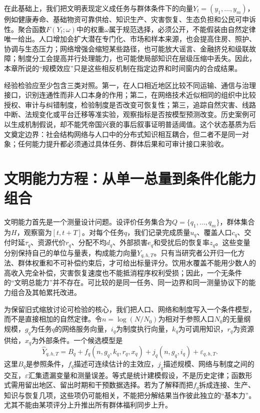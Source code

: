 在此基础上，我们把文明表现定义成任务与群体条件下的向量$Y_t=(y_1,\ldots,y_m)$，例如健康寿命、基础物资可靠供给、知识生产、灾害恢复、生态负担和公民可申诉性。聚合函数$F(Y_t;\omega)$中的权重$\omega$属于规范选择，必须公开，不能假装由自然定律唯一给出。人口增加会扩大潜在专门化、市场和样本来源，也会提高住房、照护、协调与生态压力；网络增强会缩短某些路径，也可能放大谣言、金融挤兑和级联故障；制度分工会提高并行处理能力，也可能使局部知识在层级压缩中丢失。因此，本章所说的“规模效应”只是这些相反机制在指定边界和时间窗内的合成结果。

经验检验应至少包含三类对照。第一，在人口相近地区比较不同运输、通信与治理接口，识别连通性而非人口本身的作用；第二，在网络技术近似相同的组织中比较授权、审计与纠错制度，检验制度是否改变可恢复性；第三，追踪自然灾害、线路中断、法规变化或平台迁移等准实验，观察指标是否按模型预测改变。历史案例可以生成机制假说，却不能凭帝国兴衰的事后叙事证明普适阈值。这个状态基质为后文奠定边界：社会结构网络与人口中的分布式知识相互耦合，但二者不是同一对象；任何能力提升都必须通过具体任务、群体后果和可审计接口来验收。

\section{文明能力方程：从单一总量到条件化能力组合}
\label{sec:civilization_capacity_equation}

文明能力首先是一个测量设计问题。设评价任务集合为$Q=\{q_1,\ldots,q_m\}$，群体集合为$H$，观察窗为$[t,t+T]$。对每个任务$q$，我们记录完成质量$u_q$、覆盖人口$c_q$、交付时延$\tau_q$、资源代价$r_q$、分配不均$d_q$、外部损害$e_q$和受扰后的恢复率$z_q$。这些变量分别保持自己的单位与量表，构成能力向量$Y_{q,h,T}$。只有当研究者公开归一化方法、群体权重和不可补偿约束后，才可给出标量评分。饮用水覆盖不能用少数人的高收入完全补偿，灾害恢复速度也不能抵消程序权利受损；因此，一个无条件的“文明总能力”并不存在。可比较的是同一任务、同一边界和同一测量协议下的能力组合及其帕累托改进。

为保留旧式缩放讨论可检验的核心，我们把人口、网络和制度写入一个条件模型，而不是直接相加的自然定律。令$n=\log(N/N_0)$为相对于参照人口$N_0$的无量纲规模，$g_q$为任务$q$的网络服务向量，$i_q$为制度执行向量，$k_q$为可调用知识，$r_q$为资源供给，$x_q$为外部条件。一个候选模型是
\begin{equation}
\label{eq:social_scaling}
\widehat{Y}_{q,h,T}=B_q+f_q(n,g_q,k_q,r_q,x_q)+j_q(n,g_q,i_q)+\varepsilon_{q,h,T}.
\end{equation}
这里$B_q$是参照条件，$f_q$描述可连续估计的主效应，$j_q$描述规模、网络与制度之间的交互，$\varepsilon$汇集遗漏变量和测量误差。等式是统计建模假设，不是历史定律；函数形式需用留出地区、留出时期和干预数据选择。若为了解释而把$f_q$拆成连接、生产、知识与恢复几项，这些项仍可能相关，不能把分解结果当作彼此独立的“基本力”。尤其不能由某项评分上升推出所有群体福利同步上升。

